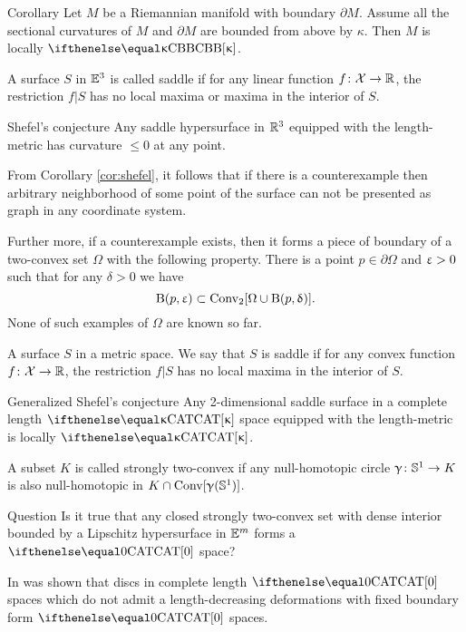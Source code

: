\begin{thm}{Corollary}
Let $M$ be a Riemannian manifold with boundary $\partial M$. 
Assume all the sectional curvatures of $M$ and $\partial M$ are bounded from above by $\kappa$.
Then $M$ is locally $\Alex\kappa$.
\end{thm}

A surface $S$ in $\mathbb{E}^3$ is called saddle if for any linear function $f\:\spc{X}\to\RR$,
the restriction $f|S$ has no local maxima or maxima in the interior of $S$.


\begin{thm}{Shefel's conjecture}
Any saddle hypersurface in $\mathbb{R}^3$ equipped with the length-metric has curvature $\le 0$ at any point.
\end{thm} 

From Corollary \ref{cor:shefel}, it follows that if there is a counterexample then arbitrary neighborhood of some point of the surface can not be presented as graph in any coordinate system.

Further more, if a counterexample exists,
then it forms a piece of boundary of a two-convex set $\Omega$ with the following property. 
There is a point $p\in\partial \Omega$ and $\upvarepsilon>0$ 
such that for any $\delta>0$  we have
\[\oBall(p,\eps)\subset\Conv_2[\Omega\cup \oBall(p,\delta)].\]
None of such examples of $\Omega$ are known so far.

A surface $S$ in a metric space.
We say that $S$ is saddle if for any convex function $f\:\spc{X}\to\RR$,
the restriction $f|S$ has no local maxima in the interior of $S$.

\begin{thm}{Generalized Shefel's  conjecture}
Any 2-dimensional saddle surface in a complete length $\CAT\kappa$ space
equipped with the length-metric is locally $\CAT\kappa$.
\end{thm}

A subset $K$ is called strongly two-convex if any null-homotopic circle $\gamma\:\SS^1\to K$ is also null-homotopic in $K\cap \Conv[\gamma(\SS^1)]$.

\begin{thm}{Question}
Is it true that any closed strongly two-convex set with dense interior bounded by a Lipschitz hypersurface in $\mathbb{E}^m$ forms a $\CAT{0}$ space? 
\end{thm}

In \cite{petrunin-metricmin} was shown that discs in complete length $\CAT{0}$ spaces 
which do not admit a length-decreasing deformations with fixed boundary form $\CAT{0}$ spaces.

